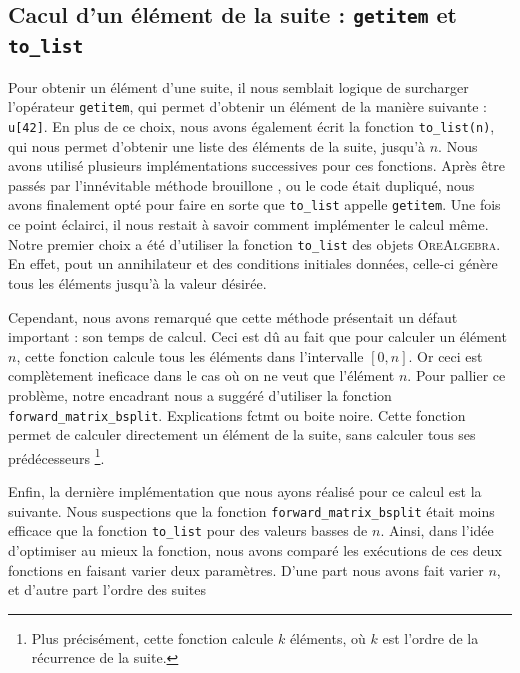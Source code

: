 \documentclass[12pt]{article}
\newlength{\charwidth}
\newcommand{\uline}{\underline{\hspace{2\charwidth}}}
\begin{document}
    \subsection{Cacul d'un élément de la suite : \texttt{\uline getitem\uline } et \texttt{to\_list}}
        \label{sec:getitem}
        Pour obtenir un élément d'une suite, il nous semblait logique de surcharger l'opérateur
        \texttt{\uline getitem\uline }, qui permet d'obtenir un élément de la manière suivante : 
        \texttt{u[42]}. En plus de ce choix, nous avons également écrit la fonction
        \texttt{to\_list(n)}, qui nous permet d'obtenir une liste des éléments de la suite, jusqu'à $n$.
        Nous avons utilisé plusieurs implémentations successives pour ces fonctions.
        Après être passés par l'innévitable \og méthode brouillone \fg, ou le code était dupliqué,
        nous avons finalement opté pour
        faire en sorte que \texttt{to\_list} appelle \texttt{\uline getitem\uline}. Une fois ce point
        éclairci, il nous restait à savoir comment implémenter le calcul même. Notre premier choix
        a été d'utiliser la fonction \texttt{to\_list} des objets \textsc{OreAlgebra}. En effet,
        pout un annihilateur et des conditions initiales données, celle-ci génère tous les éléments
        jusqu'à la valeur désirée.
        \par Cependant, nous avons remarqué que cette méthode présentait un défaut important : son
        temps de calcul. Ceci est dû au fait que pour calculer un élément $n$, cette fonction
        calcule tous les éléments dans l'intervalle $[0,n]$. Or ceci est complètement ineficace
        dans le cas où on ne veut que l'élément $n$. Pour pallier ce problème, notre encadrant nous 
        a suggéré d'utiliser la fonction \texttt{forward\_matrix\_bsplit}.
        {\color{red} Explications fctmt ou boite noire.}
        Cette fonction permet de calculer directement un élément de la suite, sans calculer tous ses
        prédécesseurs
        \footnote{Plus précisément, cette fonction calcule $k$ éléments, où  $k$ est l'ordre de la
        récurrence de la suite.}.
        \par Enfin, la dernière implémentation que nous ayons réalisé pour ce calcul est la suivante.
        Nous suspections que la fonction \texttt{forward\_matrix\_bsplit} était moins efficace que la
        fonction \texttt{to\_list} pour des valeurs basses de $n$. Ainsi, dans l'idée d'optimiser au
        mieux la fonction, nous avons comparé les exécutions de ces deux fonctions en faisant varier
        deux paramètres. D'une part nous avons fait varier $n$, et d'autre part l'ordre des suites
\end{document}

